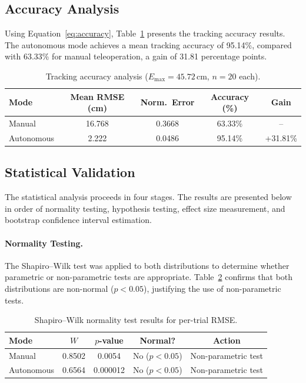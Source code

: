 \subsection{Accuracy Analysis}

Using Equation~\eqref{eq:accuracy}, Table~\ref{tab:accuracy} presents
the tracking accuracy results. The autonomous mode achieves a mean
tracking accuracy of 95.14\%, compared with 63.33\% for manual
teleoperation, a gain of 31.81 percentage points.

\begin{table}[tbp]
  \centering
  \caption{Tracking accuracy analysis ($E_{\max} = 45.72$\,cm, $n=20$ each).}
  \label{tab:accuracy}
  \begin{tabular}{lcccc}
    \toprule
    Mode       & Mean RMSE (cm) & Norm.\ Error & Accuracy (\%) & Gain \\
    \midrule
    Manual     & 16.768         & 0.3668       & 63.33\%       & --       \\
    Autonomous & 2.222          & 0.0486       & 95.14\%       & +31.81\% \\
    \bottomrule
  \end{tabular}
\end{table}

\subsection{Statistical Validation}

The statistical analysis proceeds in four stages. The results are
presented below in order of normality testing, hypothesis testing,
effect size measurement, and bootstrap confidence interval estimation.

\paragraph{Normality Testing.}
The Shapiro--Wilk test was applied to both distributions
to determine whether parametric or non-parametric tests are appropriate.
Table~\ref{tab:normality} confirms that both distributions are
non-normal ($p < 0.05$), justifying the use of non-parametric tests.

\begin{table}[tbp]
  \centering
  \caption{Shapiro--Wilk normality test results for per-trial RMSE.}
  \label{tab:normality}
  \begin{tabular}{lcccc}
    \toprule
    Mode       & $W$    & $p$-value & Normal?         & Action \\
    \midrule
    Manual     & 0.8502 & 0.0054    & No ($p < 0.05$) & Non-parametric test \\
    Autonomous & 0.6564 & 0.000012  & No ($p < 0.05$) & Non-parametric test \\
    \bottomrule
  \end{tabular}
\end{table}


